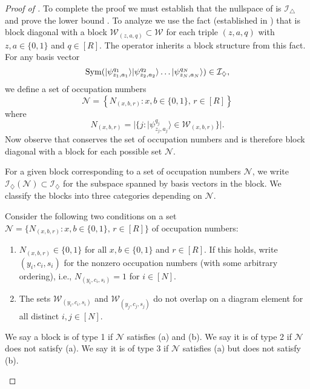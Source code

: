 \documentclass[../thesis-main/thesis-main]{subfiles}
\begin{document}
\begin{proof}[Proof of \protect{}]
To complete the proof we must establish that the nullspace of  is $\mathcal{I}_{\triangle}$ and prove the lower bound . To analyze  we use the fact (established in ) that  is block diagonal with a block $\mathcal{W}_{(z,a,q)}\subset\mathcal{W}$ for each triple $(z,a,q)$ with $z,a\in\{0,1\}$ and $q\in[R]$. The operator  inherits a block structure from this fact. For any basis vector 
\begin{equation}
\operatorname{Sym}(|\psi_{z_{1},a_{1}}^{q_{1}}\rangle|\psi_{z_{2},a_{2}}^{q_{2}}\rangle\ldots|\psi_{z_{N},a_{N}}^{q_{N}}\rangle)\in\mathcal{I}_{\diamondsuit},
\label{eq:basis_vector_in_scriptF}
\end{equation}
we define a set of occupation numbers
\[
\mathcal{N}=\left\{ N_{(x,b,r)} \colon x,b\in\{0,1\},\, r\in[R]\right\} 
\]
where
\[
  N_{(x,b,r)}
  =|\{j \colon |\psi_{z_{j},a_{j}}^{q_{j}}\rangle\in\mathcal{W}_{(x,b,r)}\}|.
\]
Now observe that  conserves the set of occupation numbers and is therefore block diagonal with a block for each possible set $\mathcal{N}$. 

For a given block corresponding to a set of occupation numbers $\mathcal{N}$, we write $\mathcal{I}_{\diamondsuit}(\mathcal{N})\subset\mathcal{\mathcal{I}_{\diamondsuit}}$ for the subspace spanned by basis vectors  in the block. We classify the blocks into three categories depending on $\mathcal{N}$.

\begin{mdframed}[frametitle=Classification of the blocks of \eq{restriction to script R} according to $\mathcal{N}$]
Consider the following two conditions on a set $\mathcal{N}=\{ N_{(x,b,r)}\colon x,b\in\{0,1\},\, r\in[R]\}$
of occupation numbers:
\begin{enumerate}[label=(\alph*)]
\item $N_{(x,b,r)}\in\{0,1\}$ for all $x,b\in\{0,1\}$ and
$r\in[R]$. If this holds, write $\left(y_{i},c_{i},s_{i}\right)$ for the nonzero occupation numbers (with some arbitrary ordering), i.e., $N_{(y_{i},c_{i},s_{i})}=1$ for $i\in[N]$.
\item The sets $\mathcal{W}_{(y_{i},c_{i},s_{i})}$ and $\mathcal{W}_{(y_{j},c_{j},s_{j})}$
do not overlap on a diagram element for all distinct $i,j\in[N]$.
\end{enumerate}
We say a block is of type 1 if $\mathcal{N}$ satisfies (a) and (b). We say it is of type 2 if $\mathcal{N}$ does not satisfy (a). We say it is of type 3 if $\mathcal{N}$ satisfies (a) but does not satisfy (b).
\end{mdframed}


\end{proof}
\end{document}
